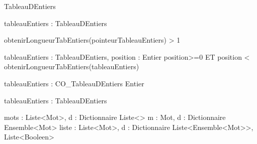 \begin{algorithme}
		{}%
		{TableauDEntiers}
		
		{tableauEntiers : TableauDEntiers}%
		{\naturel}
		
		{}%
		{}%
		{obtenirLongueurTabEntiers(pointeurTableauEntiers) > 1}
		
		{tableauEntiers : TableauDEntiers, position : \naturel}%
		{Entier}%
		{position>=0 ET position < obtenirLongueurTabEntiers(tableauEntiers)}
	
		{tableauEntiers : CO_TableauDEntiers}%
		{Entier}
		
		{tableauEntiers : TableauDEntiers}%
		{}
		
		{}%
		{}
		
		{}%
		{}

		{}%
		{}
	
		{}%
		{}
	
	
		{mots : Liste<Mot>, d : Dictionnaire}%
		{Liste<\booleen>}
		{m : Mot, d : Dictionnaire}%
		{Ensemble<Mot>}%
		{liste : Liste<Mot>, d : Dictionnaire}%
		{Liste<Ensemble<Mot>>, Liste<Booleen>}%
\end{algorithme}




\signatureFonction{}%
		{}%
		{}
